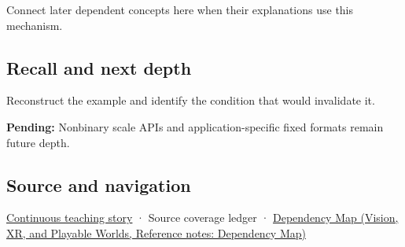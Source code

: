 Connect later dependent concepts here when their explanations use this mechanism.

\subsection{Recall and next depth}\label{appendix-1d0dbe8924cc-recall-and-next-depth}

Reconstruct the example and identify the condition that would invalidate it.

\textbf{Pending:} Nonbinary scale APIs and application-specific fixed formats remain future depth.

\subsection{Source and navigation}\label{appendix-1d0dbe8924cc-source-and-navigation}

\hyperref[01-foundations-i-ch001-choosing-what-information-to-keep]{Continuous teaching story} · {Source coverage ledger} · \href{../07-Vision-XR-and-Playable-Worlds/main.pdf\#nameddest=appendix-4ad47bdd269a}{Dependency Map (Vision, XR, and Playable Worlds, Reference notes: Dependency Map)}
